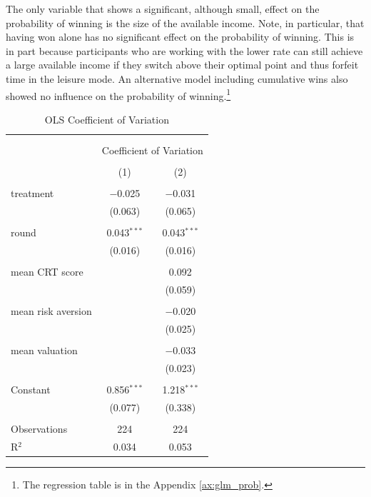 The only variable that shows a significant, although small, effect on the probability of winning is the size of the available income. Note, in particular, that having won alone has no significant effect on the probability of winning. This is in part because participants who are working with the lower rate can still achieve a large available income if they switch above their optimal point and thus forfeit time in the leisure mode. An alternative model including cumulative wins also showed no influence on the probability of winning.\footnote{The regression table is in the Appendix \ref{ax:glm_prob}.}\\


\begin{table}[!htbp] \centering 
  \caption{OLS Coefficient of Variation} 
  \label{tab:var_coeff_ols} 
\begin{tabular}{@{\extracolsep{5pt}}lcc} 
\\[-1.8ex]\hline 
\hline \\[-1.8ex] 
\\[-1.8ex] & \multicolumn{2}{c}{Coefficient of Variation} \\ 
\\[-1.8ex] & (1) & (2)\\ 
\hline \\[-1.8ex] 
 treatment & $-$0.025 & $-$0.031 \\ 
  & (0.063) & (0.065) \\ 
  & & \\ 
 round & 0.043$^{***}$ & 0.043$^{***}$ \\ 
  & (0.016) & (0.016) \\ 
  & & \\ 
 mean CRT score &  & 0.092 \\ 
  &  & (0.059) \\ 
  & & \\ 
 mean risk aversion &  & $-$0.020 \\ 
  &  & (0.025) \\ 
  & & \\ 
 mean valuation &  & $-$0.033 \\ 
  &  & (0.023) \\ 
  & & \\ 
 Constant & 0.856$^{***}$ & 1.218$^{***}$ \\ 
  & (0.077) & (0.338) \\ 
  & & \\
  \hline
Observations & 224 & 224 \\ 
R$^{2}$ & 0.034 & 0.053 \\ 

\end{tabular}
\end{table}
